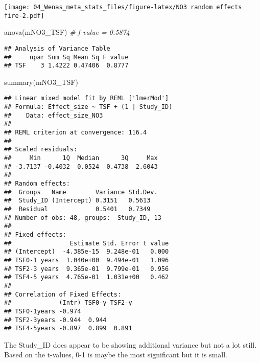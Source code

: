 \documentclass[
]{article}
\newenvironment{Shaded}{\begin{snugshade}}{\end{snugshade}}
\newcommand{\CommentTok}[1]{\textcolor[rgb]{0.56,0.35,0.01}{\textit{#1}}}
\newcommand{\FunctionTok}[1]{\textcolor[rgb]{0.00,0.00,0.00}{#1}}
\newcommand{\NormalTok}[1]{#1}
\begin{document}
\texttt{[image: 04\_Wenas\_meta\_stats\_files/figure-latex/NO3 random effects fire-2.pdf]}

\begin{Shaded}
\begin{Highlighting}[]
\FunctionTok{anova}\NormalTok{(mNO3\_TSF) }\CommentTok{\# f{-}value = 0.5874}
\end{Highlighting}
\end{Shaded}

\begin{verbatim}
## Analysis of Variance Table
##     npar Sum Sq Mean Sq F value
## TSF    3 1.4222 0.47406  0.8777
\end{verbatim}

\begin{Shaded}
\begin{Highlighting}[]
\FunctionTok{summary}\NormalTok{(mNO3\_TSF) }
\end{Highlighting}
\end{Shaded}

\begin{verbatim}
## Linear mixed model fit by REML ['lmerMod']
## Formula: Effect_size ~ TSF + (1 | Study_ID)
##    Data: effect_size_NO3
## 
## REML criterion at convergence: 116.4
## 
## Scaled residuals: 
##     Min      1Q  Median      3Q     Max 
## -3.7137 -0.4032  0.0524  0.4738  2.6043 
## 
## Random effects:
##  Groups   Name        Variance Std.Dev.
##  Study_ID (Intercept) 0.3151   0.5613  
##  Residual             0.5401   0.7349  
## Number of obs: 48, groups:  Study_ID, 13
## 
## Fixed effects:
##                Estimate Std. Error t value
## (Intercept)  -4.385e-15  9.248e-01   0.000
## TSF0-1 years  1.040e+00  9.494e-01   1.096
## TSF2-3 years  9.365e-01  9.799e-01   0.956
## TSF4-5 years  4.765e-01  1.031e+00   0.462
## 
## Correlation of Fixed Effects:
##             (Intr) TSF0-y TSF2-y
## TSF0-1years -0.974              
## TSF2-3years -0.944  0.944       
## TSF4-5years -0.897  0.899  0.891
\end{verbatim}

The Study\_ID does appear to be showing additional variance but not a
lot still. Based on the t-values, 0-1 is maybe the most significant but
it is small.
\end{document}

